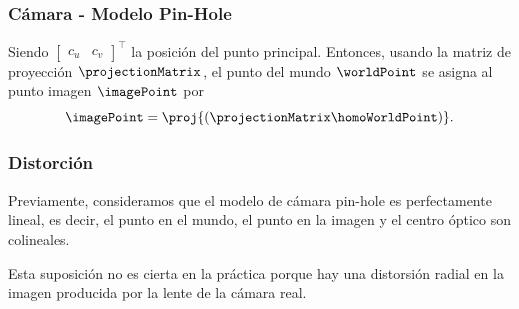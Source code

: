 \begin{frame}
	\frametitle{Cámara - Modelo Pin-Hole}
	
	\footnotesize
	
	Siendo $\begin{bmatrix}c_{u} & c_{v}\end{bmatrix}^{\top}$ la posición del punto principal. Entonces, usando la matriz de proyección $\projectionMatrix$, el punto del mundo $\worldPoint$ se asigna al punto imagen $\imagePoint$ por
	\begin{equation*}
		\imagePoint=\proj{(\projectionMatrix\homoWorldPoint)}.
	\end{equation*}
	
\end{frame}


\begin{frame}
	\frametitle{Distorción}
	
	\footnotesize
	
	Previamente, consideramos que el modelo de cámara pin-hole es perfectamente lineal, es decir, el punto en el mundo, el punto en la imagen y el centro óptico son colineales.
	
	Esta suposición no es cierta en la práctica porque hay una distorsión radial en la imagen producida por la lente de la cámara real.
	
	\begin{figure}[!h]
		\centering
	\end{figure}
	
\end{frame}


